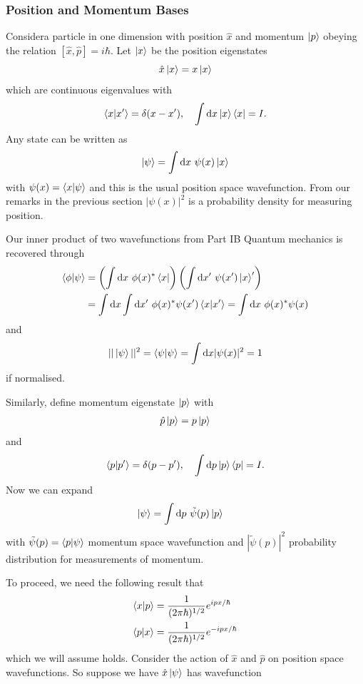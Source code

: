 \documentclass{article}
\begin{document}
\subsubsection{Position and Momentum Bases}
Considera particle in one dimension with position $ \hat x $ and momentum $ \ket p $ obeying the relation $ [\hat x,\hat p] = i \hbar $. Let $ \ket x $ be the position eigenstates
\[
  \hat x \ket x = x \ket x
\]
which are continuous eigenvalues with
\[
	\bra{x} \ket{x'} = \delta(x-x'), \quad \int\mathrm dx \ket x \bra x = I.
\]
Any state can be written as
\[
  \ket\psi = \int \mathrm dx \ \psi(x) \ket x 
\]
with $ \psi(x) = \bra{x}\ket{\psi} $ and this is the usual position space wavefunction. From our remarks in the previous section $ |\psi(x)|^2 $ is a probability density for measuring position.\par
Our inner product of two wavefunctions from Part IB Quantum mechanics is recovered through
\begin{align*}
	\bra {\phi}\ket{\psi} &= \left(\int \mathrm dx\ \phi(x)^*\bra x\right)\left(\int \mathrm dx' \ \psi(x') \ket x'\right) \\
			      &= \int \mathrm dx \int\mathrm dx' \ \phi(x)^* \psi(x') \bra{x}\ket{x'} = \int\mathrm dx \ \phi(x)^*\psi(x) \\
\end{align*}
and
\[
	||\ket \psi||^2 = \bra{\psi}\ket{\psi} = \int\mathrm dx |\psi(x)|^2 = 1
\]
if normalised.\par
Similarly, define momentum eigenstate $ \ket p $ with
\begin{align*}
  \hat p \ket p = p \ket p
\end{align*}
and
\[
	\bra{p}\ket{p'} = \delta(p-p'),\quad \int\mathrm dp \ket p \bra p = I.
\]
Now we can expand
\begin{align*}
	\ket \psi &= \int \mathrm dp \ \tilde \psi(p) \ket p 
\end{align*}
with $ \tilde \psi(p) = \bra{p}\ket{\psi} $ momentum space wavefunction and $ |\tilde \psi(p)|^2 $ probability distribution for measurements of momentum.\par
To proceed, we need the following result that
\begin{align*}
	\bra{x}\ket{p} &= \frac 1{(2\pi \hbar)^{1/2}} e^{ipx/\hbar} \\
	\bra{p}\ket{x} &= \frac 1{(2\pi \hbar)^{1/2}} e^{-ipx/\hbar} \\
\end{align*}
which we will assume holds. Consider the action of $ \hat x $ and $ \hat p $ on position space wavefunctions. So suppose we have $ \hat x \ket \psi $ has wavefunction
\end{document}
